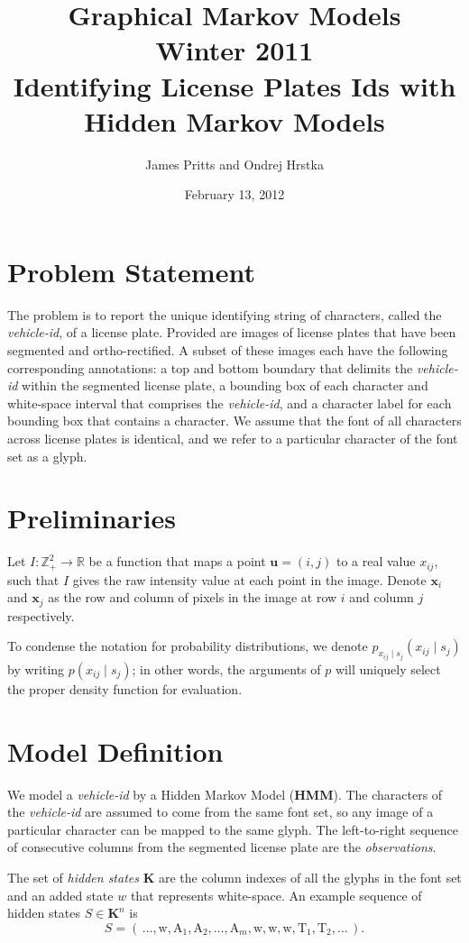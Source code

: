 \documentclass[a4paper,12pt]{article}
\title { \normalsize Graphical Markov Models \\ Winter 2011 \\
 \vspace{10mm} {\bf Identifying License Plates Ids with Hidden Markov
    Models } }
\author{\normalsize James Pritts and Ondrej Hrstka }
\date{ \small February 13, 2012 }
\begin{document}
\maketitle

\pagestyle{empty} 

\section{Problem Statement}
The problem is to report the unique identifying string of characters,
called the \emph{vehicle-id}, of a license plate.  Provided are images
of license plates that have been segmented and ortho-rectified. A
subset of these images each have the following corresponding
annotations: a top and bottom boundary that delimits the
\emph{vehicle-id} within the segmented license plate, a bounding box
of each character and white-space interval that comprises the
\emph{vehicle-id}, and a character label for each bounding box that
contains a character.  We assume that the font of all characters
across license plates is identical, and we refer to a particular
character of the font set as a glyph.

\section{Preliminaries}
Let $I\colon \mathbb{Z}^2_+ \to \mathbb{R}$ be a function that maps a
point $\mathbf{u} = (i,j)$ to a real value $x_{ij}$, such that $I$
gives the raw intensity value at each point in the image.  Denote
$\mathbf{x}_i$ and $\mathbf{x}_j$ as the row and column of pixels in
the image at row $i$ and column $j$ respectively.

To condense the notation for probability distributions, we denote
$p_{x_{ij} \mid s_j}(x_{ij} \mid s_j)$ by writing $p(x_{ij} \mid
s_j)$; in other words, the arguments of $p$ will uniquely select the
proper density function for evaluation.

\section{Model Definition}
We model a \emph{vehicle-id} by a Hidden Markov Model (\textbf{HMM}).
The characters of the \emph{vehicle-id} are assumed to come from the
same font set, so any image of a particular character can be mapped to
the same glyph.  The left-to-right sequence of consecutive columns
from the segmented license plate are the \emph{observations}.

The set of \emph{hidden states} $\mathbf{K}$ are the column indexes of
all the glyphs in the font set and an added state $w$ that represents
white-space. An example sequence of hidden states $S \in \mathbf{K}^n$
is
\[S =
\left(\,\dots,\text{w},\text{A}_1,\text{A}_2,\ldots,\text{A}_{m},\text{w},\text{w},\text{w},\text{T}_1,\text{T}_2,\ldots\,\right).\]
\end{document}
